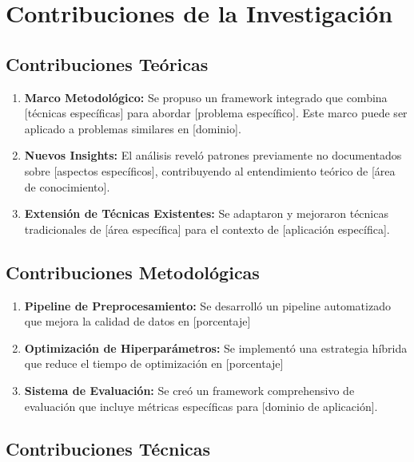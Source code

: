 \section{Contribuciones de la Investigación}

\subsection{Contribuciones Teóricas}

\begin{enumerate}
    \item \textbf{Marco Metodológico:} Se propuso un framework integrado que combina [técnicas específicas] para abordar [problema específico]. Este marco puede ser aplicado a problemas similares en [dominio].
    
    \item \textbf{Nuevos Insights:} El análisis reveló patrones previamente no documentados sobre [aspectos específicos], contribuyendo al entendimiento teórico de [área de conocimiento].
    
    \item \textbf{Extensión de Técnicas Existentes:} Se adaptaron y mejoraron técnicas tradicionales de [área específica] para el contexto de [aplicación específica].
\end{enumerate}

\subsection{Contribuciones Metodológicas}

\begin{enumerate}
    \item \textbf{Pipeline de Preprocesamiento:} Se desarrolló un pipeline automatizado que mejora la calidad de datos en [porcentaje]%
    
    \item \textbf{Optimización de Hiperparámetros:} Se implementó una estrategia híbrida que reduce el tiempo de optimización en [porcentaje]%
    
    \item \textbf{Sistema de Evaluación:} Se creó un framework comprehensivo de evaluación que incluye métricas específicas para [dominio de aplicación].
\end{enumerate}

\subsection{Contribuciones Técnicas}

